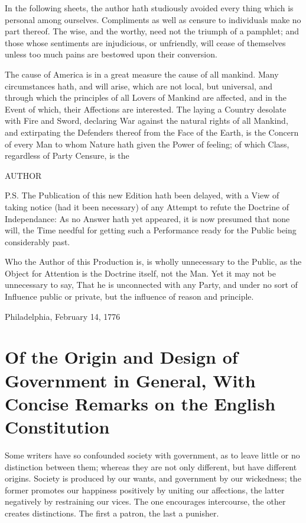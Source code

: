 \documentclass[12pt,oneside]{memoir}
\begin{document}
In the following sheets, the author hath studiously avoided every
thing which is personal among ourselves. Compliments as well as
censure to individuals make no part thereof. The wise, and the
worthy, need not the triumph of a pamphlet; and those whose
sentiments are injudicious, or unfriendly, will cease of themselves
unless too much pains are bestowed upon their conversion.

The cause of America is in a great measure the cause of all mankind.
Many circumstances hath, and will arise, which are not local, but
universal, and through which the principles of all Lovers of Mankind
are affected, and in the Event of which, their Affections are
interested. The laying a Country desolate with Fire and Sword,
declaring War against the natural rights of all Mankind, and
extirpating the Defenders thereof from the Face of the Earth, is the
Concern of every Man to whom Nature hath given the Power of feeling;
of which Class, regardless of Party Censure, is the

AUTHOR

P.S. The Publication of this new Edition hath been delayed, with a
View of taking notice (had it been necessary) of any Attempt to
refute the Doctrine of Independance: As no Answer hath yet appeared,
it is now presumed that none will, the Time needful for getting such
a Performance ready for the Public being considerably past.

Who the Author of this Production is, is wholly unnecessary to the
Public, as the Object for Attention is the Doctrine itself, not the
Man. Yet it may not be unnecessary to say, That he is unconnected
with any Party, and under no sort of Influence public or private,
but the influence of reason and principle.

Philadelphia, February 14, 1776
\mainmatter

\section*{Of the Origin and Design of Government in General, With Concise Remarks on the English Constitution}

Some writers have so confounded society with government, as to leave
little or no distinction between them; whereas they are not only
different, but have different origins. Society is produced by our
wants, and government by our wickedness; the former promotes our
happiness positively by uniting our affections, the latter
negatively by restraining our vices. The one encourages intercourse,
the other creates distinctions. The first a patron, the last a
punisher.
\end{document}
